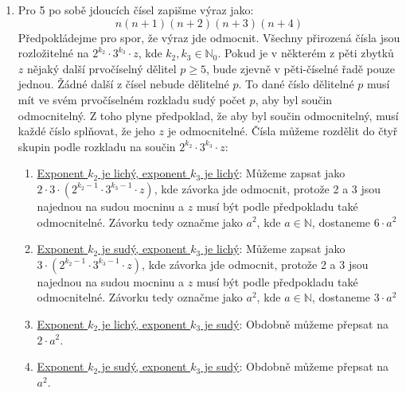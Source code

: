 \documentclass[12pt]{article}
\begin{document}
\begin{enumerate}
\begin{enumerate}
      \item Pro 5 po sobě jdoucích čísel zapišme výraz jako:
        \[
          n(n+1)(n+2)(n+3)(n+4)
        \]
        Předpokládejme pro spor, že výraz jde odmocnit.
        Všechny přirozená čísla jsou rozložitelné na $2^{k_2}\cdot3^{k_3}\cdot z$, kde $k_2,k_3 \in \mathbb{N}_0$.
        Pokud je v některém z pěti zbytků $z$ nějaký další prvočíselný dělitel $p \ge 5$, bude zjevně v
        pěti-číselné řadě pouze jednou. Žádné další z čísel nebude dělitelné $p$. To dané číslo dělitelné $p$
        musí mít ve svém prvočíselném rozkladu sudý počet $p$, aby byl součin odmocnitelný.
        Z toho plyne předpoklad, že aby byl součin odmocnitelný, musí každé číslo splňovat, že jeho $z$ je odmocnitelné.
        Čísla můžeme rozdělit do čtyř skupin podle rozkladu na součin $2^{k_2}\cdot3^{k_3}\cdot z$:
        \begin{enumerate}
          \item \underline{Exponent $k_2$ je lichý, exponent $k_3$ je lichý}:
            Můžeme zapsat jako $2\cdot3\cdot(2^{k_2-1}\cdot3^{k_3-1}\cdot z)$, kde závorka jde odmocnit, protože 2 a 3
            jsou najednou na sudou mocninu a $z$ musí být podle předpokladu také odmocnitelné.
            Závorku tedy označme jako $a^2$, kde $a\in\mathbb{N}$, dostaneme $6\cdot a^2$
          \item \underline{Exponent $k_2$ je sudý, exponent $k_3$ je lichý}:
            Můžeme zapsat jako $3\cdot(2^{k_2-1}\cdot3^{k_3-1}\cdot z)$, kde závorka jde odmocnit, protože 2 a 3
            jsou najednou na sudou mocninu a $z$ musí být podle předpokladu také odmocnitelné.
            Závorku tedy označme jako $a^2$, kde $a\in\mathbb{N}$, dostaneme $3\cdot a^2$
          \item \underline{Exponent $k_2$ je lichý, exponent $k_3$ je sudý}: Obdobně můžeme přepsat na $2\cdot a^2$.
          \item \underline{Exponent $k_2$ je sudý, exponent $k_3$ je sudý}: Obdobně můžeme přepsat na $a^2$.
        \end{enumerate}


\end{enumerate}
\end{enumerate}
\end{document}
